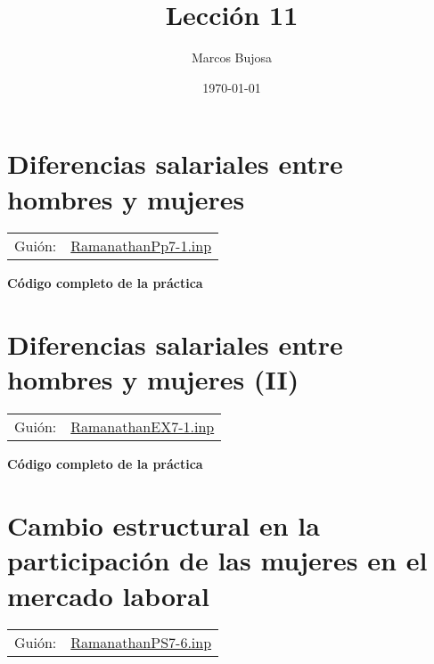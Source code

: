 \documentclass[11pt]{article}
\author{Marcos Bujosa}
\date{\today}
\title{Lección 11}
\begin{document}
\maketitle
\tableofcontents

\clearpage

\section{Diferencias salariales entre hombres y mujeres}
\label{sec:org1479d1f}
\begin{center}
\begin{tabular}{ll}
Guión: & \href{https://github.com/mbujosab/Ectr/tree/master/Practicas/Gretl/scripts/RamanathanPp7-1.inp}{RamanathanPp7-1.inp}\\[0pt]
\end{tabular}
\end{center}

\vspace{10pt}
\noindent
\textbf{Código completo de la práctica}
\vspace{10pt}

\clearpage


\section{Diferencias salariales entre hombres y mujeres (II)}
\label{sec:org1fcba8c}
\begin{center}
\begin{tabular}{ll}
Guión: & \href{https://github.com/mbujosab/Ectr/tree/master/Practicas/Gretl/scripts/RamanathanEX7-1.inp}{RamanathanEX7-1.inp}\\[0pt]
\end{tabular}
\end{center}

\vspace{10pt}
\noindent
\textbf{Código completo de la práctica}
\vspace{10pt}

\clearpage


\section{Cambio estructural en la participación de las mujeres en el mercado laboral}
\label{sec:orgd2a89be}
\begin{center}
\begin{tabular}{ll}
Guión: & \href{https://github.com/mbujosab/Ectr/tree/master/Practicas/Gretl/scripts/RamanathanPS7-6.inp}{RamanathanPS7-6.inp}\\[0pt]
\end{tabular}
\end{center}
\end{document}
